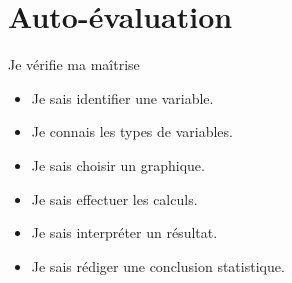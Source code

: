 \documentclass[11pt,a4paper]{article}
\begin{document}
\section{Auto-évaluation}

\begin{cadregris}{Je vérifie ma maîtrise}
\begin{itemize}
    \item[$\square$] Je sais identifier une variable.
    \item[$\square$] Je connais les types de variables.
    \item[$\square$] Je sais choisir un graphique.
    \item[$\square$] Je sais effectuer les calculs.
    \item[$\square$] Je sais interpréter un résultat.
    \item[$\square$] Je sais rédiger une conclusion statistique.
\end{itemize}
\end{cadregris}
\end{document}
